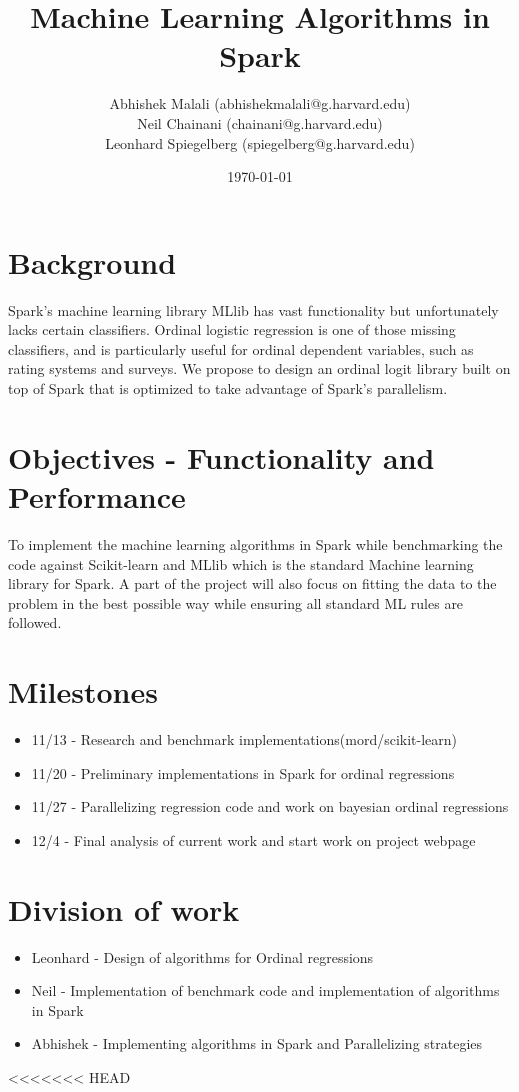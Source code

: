 \documentclass{article}
\begin{document}
	\title{Machine Learning Algorithms in Spark}
	\author{Abhishek Malali (abhishekmalali@g.harvard.edu)\\
			Neil Chainani (chainani@g.harvard.edu)\\
			Leonhard Spiegelberg (spiegelberg@g.harvard.edu)}
	\date{\today}
	\maketitle
	\section{Background}
	
	Spark's machine learning library MLlib has vast functionality but unfortunately lacks certain classifiers. Ordinal logistic regression is one of those missing classifiers, and is particularly useful for ordinal dependent variables, such as rating systems and surveys. We propose to design an ordinal logit library built on top of Spark that is optimized to take advantage of Spark's parallelism.  

	
	\section{Objectives - Functionality and Performance}
	To implement the machine learning algorithms in Spark while benchmarking the code against Scikit-learn and MLlib which is the standard Machine learning library for Spark. A part of the project will also focus on fitting the data to the problem in the best possible way while ensuring all standard ML rules are followed.


	\section{Milestones}
		\begin{itemize}
			\item 11/13 - Research and benchmark implementations(mord/scikit-learn)
			\item 11/20 - Preliminary implementations in Spark for ordinal regressions
			\item 11/27 - Parallelizing regression code and work on bayesian ordinal regressions
			\item 12/4 - Final analysis of current work and start work on project webpage
		\end{itemize}
	
	\section{Division of work}
		\begin{itemize}
			\item Leonhard - Design of algorithms for Ordinal regressions
			\item Neil - Implementation of benchmark code and implementation of algorithms in Spark
			\item Abhishek - Implementing algorithms in Spark and Parallelizing strategies
		\end{itemize}
<<<<<<< HEAD
\end{document}
